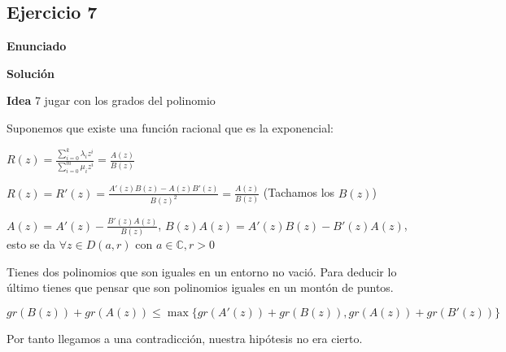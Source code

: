 \subsection{Ejercicio 7}
\textbf{Enunciado}



\textbf{Solución}

\textbf{Idea} 7 jugar con los grados del polinomio

Suponemos que  existe una función racional que es la exponencial:

$R(z) = \frac{\sum_{i=0}^k \lambda_i z^i}{\sum_{i=0}^m \mu_i z^i} = \frac{A(z)}{B(z)}$

$R(z) = R'(z) = \frac{A'(z)B(z)-A(z)B'(z)}{B(z)^2} = \frac{A(z)}{B(z)}$ 
(Tachamos los $B(z)$)

$A(z) = A'(z) - \frac{B'(z)A(z)}{B(z)}$,
$B(z)A(z) = A'(z)B(z) - B'(z)A(z)$, esto se da $\forall z\in D(a,r)$ con $a\in\mathbb{C}, r>0$

Tienes dos polinomios que son iguales en un entorno no vació. Para deducir lo último tienes que pensar que son polinomios iguales en un montón de puntos.


$gr(B(z)) + gr(A(z)) \leq \max \{ gr(A'(z)) + gr(B(z)), gr(A(z))+gr(B'(z)) \}$

Por tanto llegamos a una contradicción, nuestra hipótesis no era cierto.